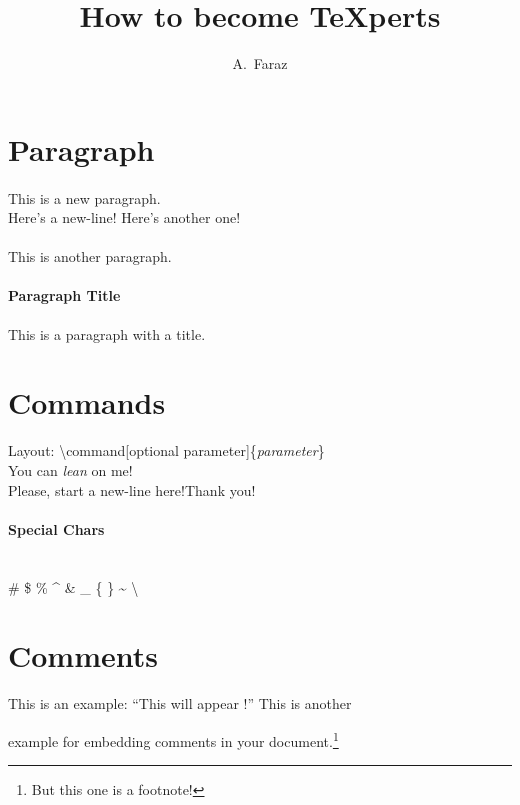 \documentclass[a4paper,11pt]{article}
\author{A.~Faraz}
\title{How to become \TeX{}perts}
\begin{document}
\maketitle
\tableofcontents

\maketitle
\pagebreak

\section{Paragraph}

\paragraph{}
This is a new paragraph. \\Here's a new-line! \newline Here's another one!

\paragraph{}
This is another paragraph.

\paragraph{Paragraph Title}
This is a paragraph with a title.

\pagebreak
\section{Commands}
Layout: \textbackslash command[optional parameter]\{\emph{parameter}\} \\ 
You can \textsl{lean} on me! \\
Please, start a new-line here!\newline Thank you!

\paragraph*{Special Chars}\mbox{}\\
\# \$ \% \^{} \& \_ \{ \} \~{}
\textbackslash

\pagebreak
\section{Comments}
This is %
an example: ``This will appear%
!''	\newline
This is another
\begin{comment}
	rather stupid,
	but helpful
\end{comment}
example for embedding comments in your document.\footnote[1]{But this one is a footnote!}
\end{document}
